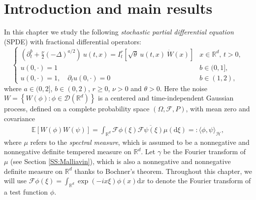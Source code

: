 \documentclass[12pt]{report}
\theoremstyle{plain}
\theoremstyle{definition}
\numberwithin{equation}{section}
\newcommand{\R}{\mathbb{R}}
\newcommand{\ud}{\ensuremath{ \mathrm{d} }}
\begin{document}
\section{Introduction and main results}
In this chapter we study the following {\it stochastic partial differential equation} (SPDE) with 
fractional differential operators:
\begin{equation} \label{E:SPDE}
\begin{cases}
\left(\partial^b_t + \frac{\nu}{2}(-\Delta)^{a/2}\right)\: u(t,x) = I^r_t \left[\sqrt{\theta}\: u(t,x)\: \dot W(x) \right] & \text{$x\in \R^d$, $t>0$}, \\
u(0,\cdot) = 1                                                                                                             & b \in (0,1],               \\
u(0,\cdot) = 1, \quad \partial_t u(0,\cdot) = 0                                                                            & b \in (1,2),
\end{cases}
\end{equation}
where $a \in (0,2]$, $b \in (0,2)$, $r\ge 0$, $\nu > 0$ and $\theta>0$. Here the noise $W = \left\{
W(\phi) : \phi \in \mathcal{D}(\R^d) \right\}$ is a centered and time-independent Gaussian process,
defined on a complete probability space $(\Omega, \mathcal{F}, P)$, with mean zero and covariance
\begin{align*}
\mathbb{E}\left[ W(\phi) W(\psi) \right] = \int_{\R^d} \mathcal{F}\phi(\xi)\overline{\mathcal{F}\psi(\xi)} \mu(\ud \xi) =: \langle \phi, \psi \rangle_{\mathcal{H}},
\end{align*}
where $\mu$ refers to the {\it spectral measure}, which is assumed to be a nonnegative and
nonnegative definite tempered measure on $\R^d$. Let $\gamma$ be the Fourier transform of $\mu$ (see
Section \ref{SS:Malliavin}), which is also a nonnegative and nonnegative definite measure on $\R^d$
thanks to Bochner's theorem. Throughout this chapter, we will use $\mathcal{F}\phi(\xi) = \int_{\R^d}
\exp(-ix \xi) \phi(x) \ud x$ to denote the Fourier transform of a test function $\phi$.
\end{document}
